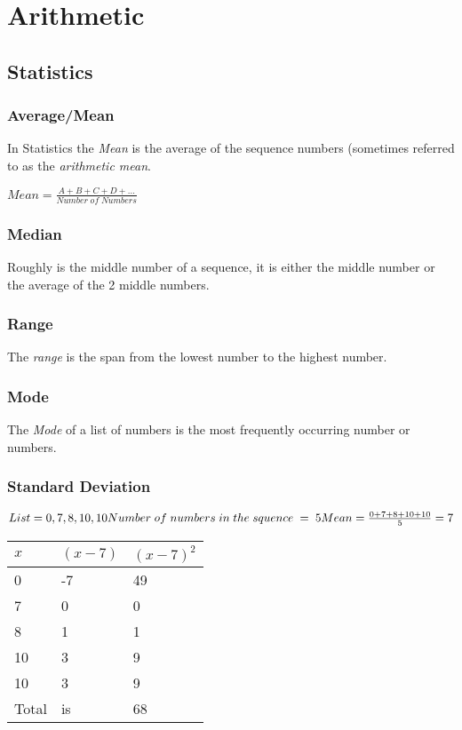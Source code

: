 \documentclass{article}
\begin{document}
\newpage
\section{Arithmetic}
\subsection{Statistics}

\subsubsection{Average/Mean}
In Statistics the \textit{Mean} is the average of the sequence numbers (sometimes referred to as the \textit{arithmetic mean}.

$
Mean = \frac{A + B + C + D + ...}{Number\; of\; Numbers}
$

\subsubsection{Median}
Roughly is the middle number of a sequence, it is either the middle number or the average of the 2 middle numbers.

\subsubsection{Range}
The \textit{range} is the span from the lowest number to the highest number.

\subsubsection{Mode}
The \textit{Mode} of a list of numbers is the most frequently occurring number or numbers.

\subsubsection{Standard Deviation} 


$
List =  0, 7, 8 , 10, 10 
\\
Number\; of\; numbers\; in\; the\; squence\; =\; 5
\\
Mean = \frac{0 + 7 + 8 + 10 + 10}{5} =  7
\\$



\begin{tabular}{l|ll}
$x$ & $(x - 7)$ & $(x -7)^{2}$  \\
\hline
0 & -7 & 49  \\
7 & 0 &  0 \\
8 & 1 & 1  \\
10 & 3 & 9  \\
10 & 3 & 9  \\
\hline

Total & is & 68  \\
\end{tabular}
\end{document}

